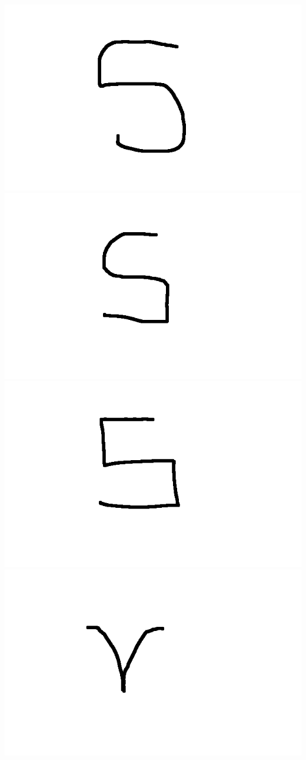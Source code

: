 \documentclass[a4paper,12px,twocolumn]{article}
\begin{document}
\begin{flushleft}
        \includegraphics[scale=0.1]{tS11}
        \includegraphics[scale=0.1]{tS12}
        \includegraphics[scale=0.1]{tS13}
        \includegraphics[scale=0.1]{tv11}

\end{flushleft}
\end{document}
